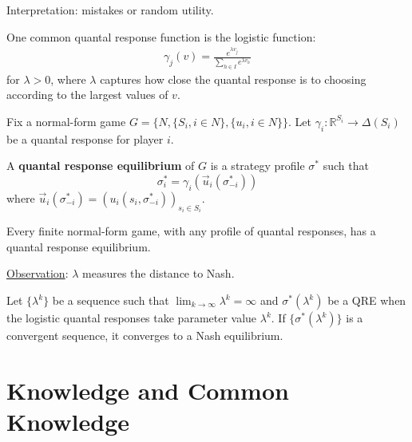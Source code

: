 \documentclass[11pt]{elegantbook_2}
\begin{document}
Interpretation: mistakes or random utility.

One common quantal response function is the logistic function:
\begin{equation}
    \begin{aligned}
        \gamma_j(v)=\frac{e^{\lambda v_j}}{\sum_{h\in I} e^{\lambda v_h}}
    \end{aligned}
    \nonumber
\end{equation}
for $\lambda>0$, where $\lambda$ captures how close the quantal response is to choosing according to the largest values of $v$.

Fix a normal-form game $G=\{N,\{S_i,i\in N\},\{u_i,i\in N\}\}$. Let $\gamma_i: \mathbb{R}^{S_i} \rightarrow \Delta(S_i)$ be a quantal response for player $i$.
\begin{definition}
    A \textbf{quantal response equilibrium} of $G$ is a strategy profile $\sigma^*$ such that $$\sigma^*_i=\gamma_i\left(\vec{u}_i(\sigma^*_{-i})\right)$$
    where $\vec{u}_i(\sigma^*_{-i})=(u_i(s_i,\sigma^*_{-i}))_{s_i\in S_{i}}$.
\end{definition}

\begin{proposition}
    Every finite normal-form game, with any profile of quantal responses, has a quantal response equilibrium.
\end{proposition}


\underline{Observation}: $\lambda$ measures the distance to Nash.
\begin{proposition}
    Let $\{\lambda^k\}$ be a sequence such that $\lim_{k \rightarrow \infty}\lambda^k=\infty$ and $\sigma^*(\lambda^k)$ be a QRE when the logistic quantal responses take parameter value $\lambda^k$. If $\{\sigma^*(\lambda^k)\}$ is a convergent sequence, it converges to a Nash equilibrium.
\end{proposition}

\section{Knowledge and Common Knowledge}
\end{document}
